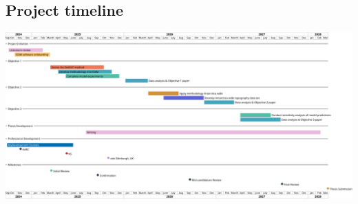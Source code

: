 \begin{landscape}
\section*{Project timeline}
    \hspace{-2.5em}
    \includegraphics[width=1\linewidth]{timeline.png}
\end{landscape}